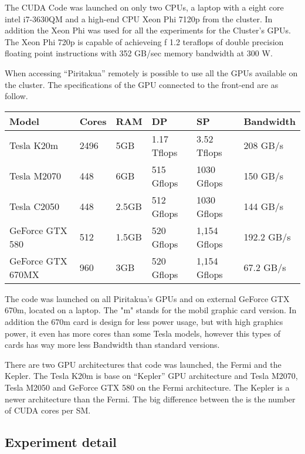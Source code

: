  The CUDA Code was launched on only two CPUs, a laptop with a eight core intel i7-3630QM and a high-end CPU Xeon Phi 7120p from the cluster. In addition the Xeon Phi was used for all the experiments for the Cluster's GPUs. The Xeon Phi 720p is capable of achieveing f 1.2 teraflops of double precision floating point instructions with 352 GB/sec memory bandwidth at 300 W.

When accessing ``Piritakua'' remotely is possible to use all the GPUs available on the cluster.
 The specifications of the GPU connected to the front-end are as follow.

  \begin{tabular}{ |  l  |  l  |  l  |  l  |  l  | l | }
    \hline
    Model & Cores & RAM & DP & SP & Bandwidth \\
    \hline
    Tesla K20m & 2496 & 5GB & 1.17 Tflops & 3.52 Tflops & 208 GB/s \\
   \hline
    Tesla M2070 & 448 & 6GB & 515 Gflops & 1030 Gflops & 150 GB/s \\
   \hline
     Tesla C2050 & 448 & 2.5GB & 512 Gflops & 1030 Gflops & 144 GB/s \\
   \hline
      GeForce GTX 580 & 512 & 1.5GB & 520 Gflops & 1,154 Gflops & 192.2 GB/s \\
   \hline
   GeForce GTX 670MX & 960 & 3GB & 520 Gflops & 1,154 Gflops & 67.2 GB/s \\
   \hline
  \end{tabular}

   The code was launched on all Piritakua's GPUs and on external GeForce GTX 670m, located on a laptop. The "m" stands for the mobil graphic card version. In addition the 670m card is design for less power usage, but with high graphics power, it even has more cores than some Tesla models, however this types of cards has way more less Bandwidth than standard versions.

There are two GPU architectures that code was launched, the Fermi and the Kepler. The Tesla K20m is base on ``Kepler'' GPU architecture and Tesla M2070, Tesla M2050 and GeForce GTX 580 on the Fermi architecture. The Kepler is a newer architecture than the Fermi. The big difference between the is the number of CUDA cores per SM.


\subsection{Experiment detail}



